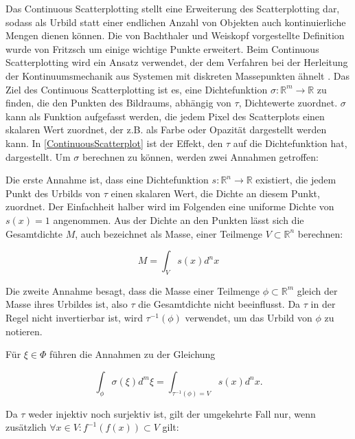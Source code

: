 \documentclass[a4paper,fontsize=12pt,toc=bib,parskip=half,ngerman]{scrartcl}
\begin{document}
Das Continuous Scatterplotting stellt eine Erweiterung des Scatterplotting dar, sodass als Urbild statt einer endlichen Anzahl von Objekten auch kontinuierliche Mengen dienen k\"onnen. Die von Bachthaler und Weiskopf\cite{bachthaler2008continuous} vorgestellte Definition wurde von Fritzsch\cite{fritzsch2016continuousScatterplot} um einige wichtige Punkte erweitert. Beim Continuous Scatterplotting wird ein Ansatz verwendet, der dem Verfahren bei der Herleitung der Kontinuumsmechanik aus Systemen mit diskreten Massepunkten \"ahnelt \cite[S.~1429]{bachthaler2008continuous}. Das Ziel des Continuous Scatterplotting ist es, eine Dichtefunktion $\sigma: \mathbb{R}^m \rightarrow \mathbb{R}$ zu finden, die den Punkten des Bildraums, abh\"angig von $\tau$, Dichtewerte zuordnet. $\sigma$ kann als Funktion aufgefasst werden, die jedem Pixel des Scatterplots einen skalaren Wert zuordnet, der z.B. als Farbe oder Opazit\"at dargestellt werden kann. In \cref{ContinuousScatterplot} ist der Effekt, den $\tau$ auf die Dichtefunktion hat, dargestellt. Um $\sigma$ berechnen zu k\"onnen, werden zwei Annahmen getroffen:

Die erste Annahme ist, dass eine Dichtefunktion $s: \mathbb{R}^n \rightarrow \mathbb{R}$ existiert, die jedem Punkt des Urbilds von $\tau$ einen skalaren Wert, die Dichte an diesem Punkt, zuordnet. Der Einfachheit halber wird im Folgenden eine uniforme Dichte von $s(x) = 1$ angenommen. Aus der Dichte an den Punkten l\"asst sich die Gesamtdichte $M$, auch bezeichnet als Masse, einer Teilmenge $V\subset\mathbb{R}^n$ berechnen:

\begin{equation}
M = \int_{V}s(x)d^nx
\label{Dichtefunktion}
\end{equation}

Die zweite Annahme besagt, dass die Masse einer Teilmenge $\phi\subset\mathbb{R}^m$ gleich der Masse ihres Urbildes ist, also $\tau$ die Gesamtdichte nicht beeinflusst. Da $\tau$ in der Regel nicht invertierbar ist, wird $\tau^{-1}(\phi)$ verwendet, um das Urbild von $\phi$ zu notieren. 


F\"ur $\xi \in \Phi$ f\"uhren die Annahmen zu der Gleichung

\begin{equation}
\int_{\phi}\sigma(\xi)d^m\xi = \int_{\tau^{-1}(\phi) = V}s(x)d^nx.
\end{equation}

Da $\tau$ weder injektiv noch surjektiv ist, gilt der umgekehrte Fall nur, wenn zus\"atzlich $\forall x \in V: f^{-1}(f(x)) \subset V$ gilt\cite [S.~20]{fritzsch2016continuousScatterplot}:
\end{document}
